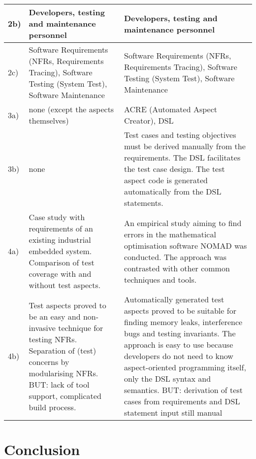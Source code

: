 \begin{landscape}
\begin{small}
\begin{table}
\begin{longtable}{>{\raggedright}p{0.5cm}|>{}p{11cm}|>{}p{11cm}}
2b)
& Developers, testing and maintenance personnel
& Developers, testing and maintenance personnel\\ 
\hline
2c)
 & Software Requirements (NFRs, Requirements Tracing), Software Testing (System Test), Software Maintenance 
& Software Requirements (NFRs, Requirements Tracing), Software Testing (System Test), Software Maintenance\\ 
\hline %
3a) 
& none (except the aspects themselves)
&ACRE (Automated Aspect Creator), DSL\\ 
\hline
3b) 
&  none 
& Test cases and testing objectives must be derived manually from the requirements. The DSL facilitates the test case design. The test aspect code is generated automatically from the DSL statements.\\ 
\hline %
4a)
& Case study with requirements of an existing industrial embedded system. Comparison of test coverage with and without test aspects.
& An empirical study aiming to find errors in the mathematical optimisation software NOMAD was conducted. The approach was contrasted with other common techniques and tools.\\ 
\hline
4b)
& Test aspects proved to be an easy and non-invasive technique for testing NFRs. Separation of (test) concerns by modularising NFRs.  BUT: lack of tool support, complicated build process. 
& Automatically generated test aspects proved to be suitable for finding memory leaks, interference bugs and testing invariants. The approach is easy to use because developers do not need to know aspect-oriented programming itself, only the DSL syntax and semantics. BUT: derivation of test cases from requirements and DSL statement input still manual\\ 
\hline %
\end{longtable}
\label{syn}
\end{table}
\end{small}
\end{landscape}
\restoregeometry

\newpage
\section{Conclusion} \label{feierabend}

